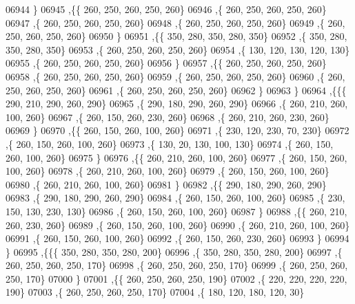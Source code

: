 \begin{DoxyCode}
06944     \}
06945    ,\{\{   260,   250,   260,   250,   260\}
06946     ,\{   260,   250,   260,   250,   260\}
06947     ,\{   260,   250,   260,   250,   260\}
06948     ,\{   260,   250,   260,   250,   260\}
06949     ,\{   260,   250,   260,   250,   260\}
06950     \}
06951    ,\{\{   350,   280,   350,   280,   350\}
06952     ,\{   350,   280,   350,   280,   350\}
06953     ,\{   260,   250,   260,   250,   260\}
06954     ,\{   130,   120,   130,   120,   130\}
06955     ,\{   260,   250,   260,   250,   260\}
06956     \}
06957    ,\{\{   260,   250,   260,   250,   260\}
06958     ,\{   260,   250,   260,   250,   260\}
06959     ,\{   260,   250,   260,   250,   260\}
06960     ,\{   260,   250,   260,   250,   260\}
06961     ,\{   260,   250,   260,   250,   260\}
06962     \}
06963    \}
06964   ,\{\{\{   290,   210,   290,   260,   290\}
06965     ,\{   290,   180,   290,   260,   290\}
06966     ,\{   260,   210,   260,   100,   260\}
06967     ,\{   260,   150,   260,   230,   260\}
06968     ,\{   260,   210,   260,   230,   260\}
06969     \}
06970    ,\{\{   260,   150,   260,   100,   260\}
06971     ,\{   230,   120,   230,    70,   230\}
06972     ,\{   260,   150,   260,   100,   260\}
06973     ,\{   130,    20,   130,   100,   130\}
06974     ,\{   260,   150,   260,   100,   260\}
06975     \}
06976    ,\{\{   260,   210,   260,   100,   260\}
06977     ,\{   260,   150,   260,   100,   260\}
06978     ,\{   260,   210,   260,   100,   260\}
06979     ,\{   260,   150,   260,   100,   260\}
06980     ,\{   260,   210,   260,   100,   260\}
06981     \}
06982    ,\{\{   290,   180,   290,   260,   290\}
06983     ,\{   290,   180,   290,   260,   290\}
06984     ,\{   260,   150,   260,   100,   260\}
06985     ,\{   230,   150,   130,   230,   130\}
06986     ,\{   260,   150,   260,   100,   260\}
06987     \}
06988    ,\{\{   260,   210,   260,   230,   260\}
06989     ,\{   260,   150,   260,   100,   260\}
06990     ,\{   260,   210,   260,   100,   260\}
06991     ,\{   260,   150,   260,   100,   260\}
06992     ,\{   260,   150,   260,   230,   260\}
06993     \}
06994    \}
06995   ,\{\{\{   350,   280,   350,   280,   200\}
06996     ,\{   350,   280,   350,   280,   200\}
06997     ,\{   260,   250,   260,   250,   170\}
06998     ,\{   260,   250,   260,   250,   170\}
06999     ,\{   260,   250,   260,   250,   170\}
07000     \}
07001    ,\{\{   260,   250,   260,   250,   190\}
07002     ,\{   220,   220,   220,   220,   190\}
07003     ,\{   260,   250,   260,   250,   170\}
07004     ,\{   180,   120,   180,   120,    30\}

\end{DoxyCode}
